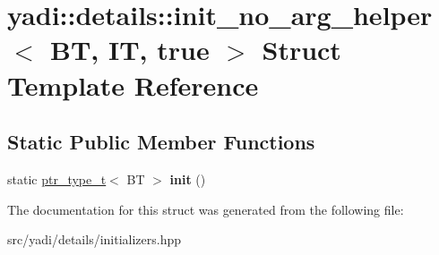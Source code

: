 \hypertarget{structyadi_1_1details_1_1init__no__arg__helper_3_01_b_t_00_01_i_t_00_01true_01_4}{}\section{yadi\+:\+:details\+:\+:init\+\_\+no\+\_\+arg\+\_\+helper$<$ BT, IT, true $>$ Struct Template Reference}
\label{structyadi_1_1details_1_1init__no__arg__helper_3_01_b_t_00_01_i_t_00_01true_01_4}
\subsection*{Static Public Member Functions}
\begin{DoxyCompactItemize}
\item 
\mbox{\label{structyadi_1_1details_1_1init__no__arg__helper_3_01_b_t_00_01_i_t_00_01true_01_4_a12f7dde0d08a746a0b4855b6009bbb40}} 
static \hyperlink{namespaceyadi_a92290eb27cd90666aa87b17d854af9fe}{ptr\+\_\+type\+\_\+t}$<$ BT $>$ {\bfseries init} ()
\end{DoxyCompactItemize}


The documentation for this struct was generated from the following file\+:\begin{DoxyCompactItemize}
\item 
src/yadi/details/initializers.\+hpp\end{DoxyCompactItemize}
